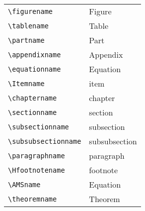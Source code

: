\clearpage
{

\tablelasttail{}
\begin{center}
\begin{xtabular}{|p{5cm}|p{5cm}|}
\midrule
\verb|\figurename|        & Figure        \\
\verb|\tablename|         & Table         \\
\verb|\partname|          & Part          \\
\verb|\appendixname|      & Appendix      \\
\verb|\equationname|      & Equation      \\
\verb|\Itemname|          & item          \\
\verb|\chaptername|       & chapter       \\
\verb|\sectionname|       & section       \\
\verb|\subsectionname|    & subsection    \\
\verb|\subsubsectionname| & subsubsection \\
\verb|\paragraphname|     & paragraph     \\
\verb|\Hfootnotename|     & footnote      \\
\verb|\AMSname|           & Equation      \\
\verb|\theoremname|       & Theorem       \\
\midrule
\end{xtabular}
\end{center}
} 

